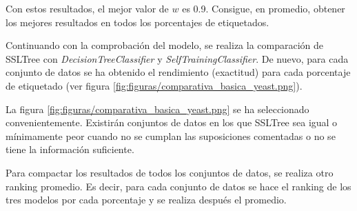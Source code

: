 \begin{table}[h]
\caption{Ranking promedio de cada valor de $w$}
\label{tab:ranking-w}
\end{table}

Con estos resultados, el mejor valor de $w$ es 0.9. Consigue, en promedio, obtener los mejores resultados en todos los porcentajes de etiquetados.\newline

Continuando con la comprobación del modelo, se realiza la comparación de SSLTree con \textit{DecisionTreeClassifier} y \textit{SelfTrainingClassifier}. De nuevo, para cada conjunto de datos se ha obtenido el rendimiento (exactitud) para cada porcentaje de etiquetado (ver figura \ref{fig:figuras/comparativa_basica_yeast.png}).


La figura \ref{fig:figuras/comparativa_basica_yeast.png} se ha seleccionado convenientemente. Existirán conjuntos de datos en los que SSLTree sea igual o mínimamente peor cuando no se cumplan las suposiciones comentadas o no se tiene la información suficiente.

Para compactar los resultados de todos los conjuntos de datos, se realiza otro ranking promedio. Es decir, para cada conjunto de datos se hace el ranking de los tres modelos por cada porcentaje y se realiza después el promedio.


